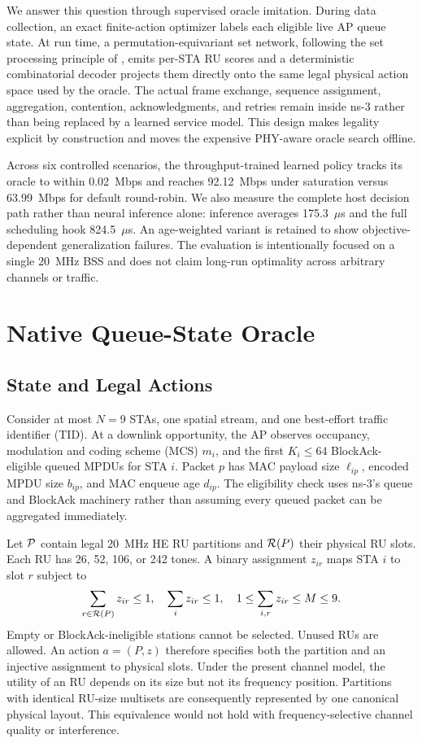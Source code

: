 \documentclass[lettersize,journal]{IEEEtran}
\begin{document}
We answer this question through supervised oracle imitation. During data
collection, an exact finite-action optimizer labels each eligible live AP queue
state. At run time, a permutation-equivariant set network, following the set
processing principle of \cite{zaheer2017deep}, emits per-STA RU scores and a
deterministic combinatorial decoder projects them directly onto the same legal
physical action space used by the oracle. The actual frame exchange, sequence
assignment, aggregation, contention, acknowledgments, and retries remain inside
ns-3 rather than being replaced by a learned service model. This design makes
legality explicit by construction and moves the expensive PHY-aware oracle
search offline.

Across six controlled scenarios, the throughput-trained learned policy tracks
its oracle to within 0.02~Mbps and reaches 92.12~Mbps under saturation versus
63.99~Mbps for default round-robin. We also measure the complete host decision
path rather than neural inference alone: inference averages 175.3~$\mu$s and
the full scheduling hook 824.5~$\mu$s. An age-weighted variant is retained to
show objective-dependent generalization failures. The evaluation is intentionally
focused on a single 20~MHz BSS and does not claim long-run optimality across
arbitrary channels or traffic.

\section{Native Queue-State Oracle}
\label{sec:oracle}
\subsection{State and Legal Actions}
Consider at most $N=9$ STAs, one spatial stream, and one best-effort traffic
identifier (TID). At a downlink opportunity, the AP observes occupancy,
modulation and coding scheme (MCS) $m_i$, and the first $K_i\leq64$
BlockAck-eligible queued MPDUs for STA $i$. Packet $p$ has MAC payload size
$\ell_{ip}$, encoded MPDU size $b_{ip}$, and MAC enqueue age $d_{ip}$.
The eligibility check uses ns-3's queue and BlockAck machinery rather than
assuming every queued packet can be aggregated immediately.

Let $\mathcal{P}$ contain legal 20~MHz HE RU partitions and $\mathcal{R}(P)$ their physical
RU slots. Each RU has 26, 52, 106, or 242 tones. A binary assignment $z_{ir}$
maps STA $i$ to slot $r$ subject to
\begin{equation}
 \sum_{r\in\mathcal{R}(P)}z_{ir}\leq1,\quad \sum_i z_{ir}\leq1,\quad
 1\leq\sum_{i,r}z_{ir}\leq M\leq9.
 \label{eq:legal}
\end{equation}
Empty or BlockAck-ineligible stations cannot be selected. Unused RUs are
allowed. An action $a=(P,z)$ therefore specifies both the partition and
an injective assignment to physical slots. Under the present channel model,
the utility of an RU depends on its size but not its frequency position.
Partitions with identical RU-size multisets are consequently represented by
one canonical physical layout. This equivalence would not hold with
frequency-selective channel quality or interference.
\end{document}
